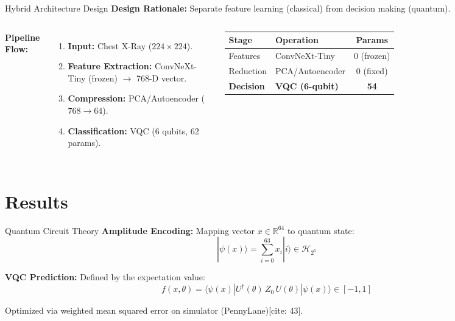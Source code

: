 \documentclass[aspectratio=169, 10pt]{beamer}
\begin{document}
\begin{frame}{Hybrid Architecture Design}
  \textbf{Design Rationale:} Separate feature learning (classical) from decision making (quantum).

  \vspace{0.5cm}

  \begin{columns}[T] %
       \textbf{Pipeline Flow:}
       \begin{enumerate}
           \item \textbf{Input:} Chest X-Ray ($224 \times 224$).
           \item \textbf{Feature Extraction:} ConvNeXt-Tiny (frozen) $\rightarrow$ 768-D vector.
           \item \textbf{Compression:} PCA/Autoencoder ($768 \rightarrow 64$).
           \item \textbf{Classification:} VQC (6 qubits, 62 params).
       \end{enumerate}

      \centering
      \footnotesize
       \begin{tabular}{llc}
         \toprule
         \textbf{Stage} & \textbf{Operation} & \textbf{Params} \\
         \midrule
         Features & ConvNeXt-Tiny & 0 (frozen) \\
         Reduction & PCA/Autoencoder & 0 (fixed) \\
         \textbf{Decision} & \textbf{VQC (6-qubit)} & \textbf{54} \\
         \bottomrule
       \end{tabular}
      \vspace{0.2cm}
  \end{columns}
\end{frame}

\section{Results}

\begin{frame}{Quantum Circuit Theory}
  \textbf{Amplitude Encoding:}
  Mapping vector $x \in \mathbb{R}^{64}$ to quantum state:
  $$ |\psi(x)\rangle = \sum_{i=0}^{63} x_i |i\rangle \in \mathcal{H}_{2^6} $$
  
  \vspace{0.3cm}
  
  \textbf{VQC Prediction:}
  Defined by the expectation value:
  $$ f(x,\theta) = \langle \psi(x) | U^\dagger(\theta)\, Z_0\, U(\theta) | \psi(x) \rangle \in [-1,1] $$
  
  \vspace{0.3cm}
  \small{Optimized via weighted mean squared error on simulator (PennyLane)[cite: 43].}
\end{frame}
\end{document}
